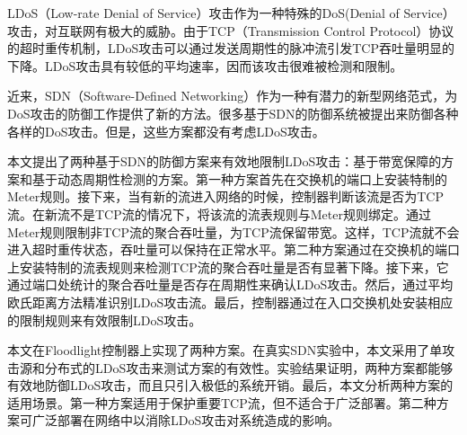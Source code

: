\begin{cabstract}
  LDoS（Low-rate Denial of Service）攻击作为一种特殊的DoS(Denial of Service）攻击，对互联网有极大的威胁。由于TCP（Transmission Control Protocol）协议的超时重传机制，LDoS攻击可以通过发送周期性的脉冲流引发TCP吞吐量明显的下降。LDoS攻击具有较低的平均速率，因而该攻击很难被检测和限制。

  近来，SDN（Software-Defined Networking）作为一种有潜力的新型网络范式，为DoS攻击的防御工作提供了新的方法。很多基于SDN的防御系统被提出来防御各种各样的DoS攻击。但是，这些方案都没有考虑LDoS攻击。

  本文提出了两种基于SDN的防御方案来有效地限制LDoS攻击：基于带宽保障的方案和基于动态周期性检测的方案。第一种方案首先在交换机的端口上安装特制的Meter规则。接下来，当有新的流进入网络的时候，控制器判断该流是否为TCP流。在新流不是TCP流的情况下，将该流的流表规则与Meter规则绑定。通过Meter规则限制非TCP流的聚合吞吐量，为TCP流保留带宽。这样，TCP流就不会进入超时重传状态，吞吐量可以保持在正常水平。第二种方案通过在交换机的端口上安装特制的流表规则来检测TCP流的聚合吞吐量是否有显著下降。接下来，它通过端口处统计的聚合吞吐量是否存在周期性来确认LDoS攻击。然后，通过平均欧氏距离方法精准识别LDoS攻击流。最后，控制器通过在入口交换机处安装相应的限制规则来有效限制LDoS攻击。

  本文在Floodlight控制器上实现了两种方案。在真实SDN实验中，本文采用了单攻击源和分布式的LDoS攻击来测试方案的有效性。实验结果证明，两种方案都能够有效地防御LDoS攻击，而且只引入极低的系统开销。最后，本文分析两种方案的适用场景。第一种方案适用于保护重要TCP流，但不适合于广泛部署。第二种方案可广泛部署在网络中以消除LDoS攻击对系统造成的影响。

\end{cabstract}


